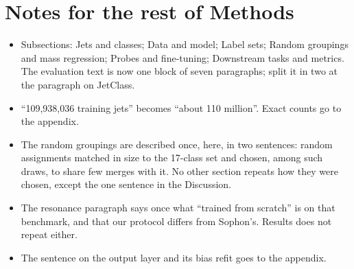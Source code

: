 \documentclass[11pt,a4paper]{article}
\begin{document}
\section*{Notes for the rest of Methods}
\begin{itemize}\itemsep2pt
\item Subsections: Jets and classes; Data and model; Label sets; Random groupings and mass
regression; Probes and fine-tuning; Downstream tasks and metrics. The evaluation text is now one
block of seven paragraphs; split it in two at the paragraph on JetClass.
\item ``109,938,036 training jets'' becomes ``about 110 million''. Exact counts go to the appendix.
\item The random groupings are described once, here, in two sentences: random assignments matched
in size to the 17-class set and chosen, among such draws, to share few merges with it. No other
section repeats how they were chosen, except the one sentence in the Discussion.
\item The resonance paragraph says once what ``trained from scratch'' is on that benchmark, and
that our protocol differs from Sophon's. Results does not repeat either.
\item The sentence on the output layer and its bias refit goes to the appendix.
\end{itemize}
\end{document}
